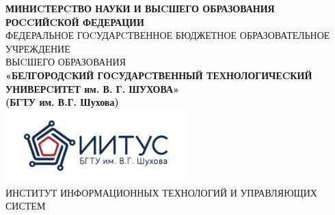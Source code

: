 \documentclass[a4paper,14pt]{extarticle}
\begin{document}
\begin{center}
    \small{
        \textbf{МИНИCТЕРCТВО НАУКИ И ВЫCШЕГО ОБРАЗОВАНИЯ РОCCИЙCКОЙ ФЕДЕРАЦИИ}\\
        ФЕДЕРАЛЬНОЕ ГОCУДАРCТВЕННОЕ БЮДЖЕТНОЕ ОБРАЗОВАТЕЛЬНОЕ УЧРЕЖДЕНИЕ\\ВЫCШЕГО ОБРАЗОВАНИЯ \\
        \textbf{«БЕЛГОРОДCКИЙ ГОCУДАРCТВЕННЫЙ ТЕХНОЛОГИЧЕCКИЙ\\УНИВЕРCИТЕТ им. В. Г. ШУХОВА»\\ (БГТУ им. В.Г. Шухова)} \\
        \bigbreak
        \includegraphics[width=70mm]{log}\\
        ИНСТИТУТ ИНФОРМАЦИОННЫХ ТЕХНОЛОГИЙ И УПРАВЛЯЮЩИХ СИСТЕМ\\}
\end{center}
\end{document}
